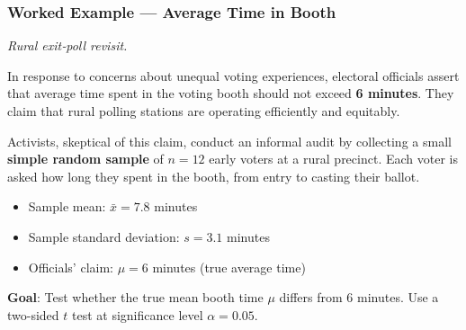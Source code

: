 \documentclass[handout]{beamer}
\begin{document}
\begin{frame}
\frametitle{Worked Example — Average Time in Booth}
\small
\textit{Rural exit‑poll revisit.}

\vspace{0.5em}
In response to concerns about unequal voting experiences, electoral officials assert that average time spent in the voting booth should not exceed \textbf{6 minutes}. They claim that rural polling stations are operating efficiently and equitably.

\vspace{0.5em}
Activists, skeptical of this claim, conduct an informal audit by collecting a small \textbf{simple random sample} of \(n=12\) early voters at a rural precinct. Each voter is asked how long they spent in the booth, from entry to casting their ballot.

\vspace{0.5em}
\begin{itemize}
  \item Sample mean: \(\bar x = 7.8\) minutes
  \item Sample standard deviation: \(s = 3.1\) minutes
  \item Officials’ claim: \(\mu = 6\) minutes (true average time)
\end{itemize}

\vspace{0.5em}
\textbf{Goal}: Test whether the true mean booth time \(\mu\) differs from 6 minutes. Use a two-sided \(t\) test at significance level \(\alpha = 0.05\).
\end{frame}
\end{document}
